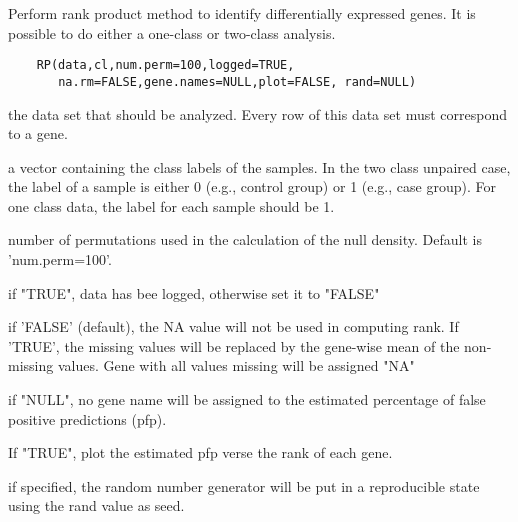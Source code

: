 \begin{Description}\relax
Perform rank product method to identify differentially 
expressed genes.
It is possible to do either a one-class or two-class analysis.
\end{Description}
\begin{Usage}
\begin{verbatim}
    RP(data,cl,num.perm=100,logged=TRUE,
       na.rm=FALSE,gene.names=NULL,plot=FALSE, rand=NULL)
\end{verbatim}
\end{Usage}
\begin{Arguments}
\begin{ldescription}
\item[\code{data}] the data set that should be analyzed. Every 
row of this data set must correspond to a gene.
\item[\code{cl}] a vector containing the class labels of the samples.
In the two class unpaired case, the label of a 
sample is either 0 (e.g., control group) or 1 
(e.g., case group). For one class  data, the label for 
each sample should be 1.
\item[\code{num.perm}] number of permutations used in the 
calculation of the null density. Default is 'num.perm=100'.
\item[\code{logged}] if "TRUE", data has bee logged, otherwise set it 
to "FALSE"
\item[\code{na.rm}] if 'FALSE' (default), the NA value will not
be used in computing rank. If 'TRUE', the missing 
values will be replaced by the gene-wise mean of
the non-missing values. Gene with all values missing 
will be assigned "NA"
\item[\code{gene.names}] if "NULL", no gene name will be assigned 
to the estimated percentage of 
false positive predictions (pfp).
\item[\code{plot}] If "TRUE", plot the estimated pfp verse the 
rank of each gene.
\item[\code{rand}] if specified, the random number generator will 
be put in a reproducible state using the rand value as seed.
\end{ldescription}
\end{Arguments}
